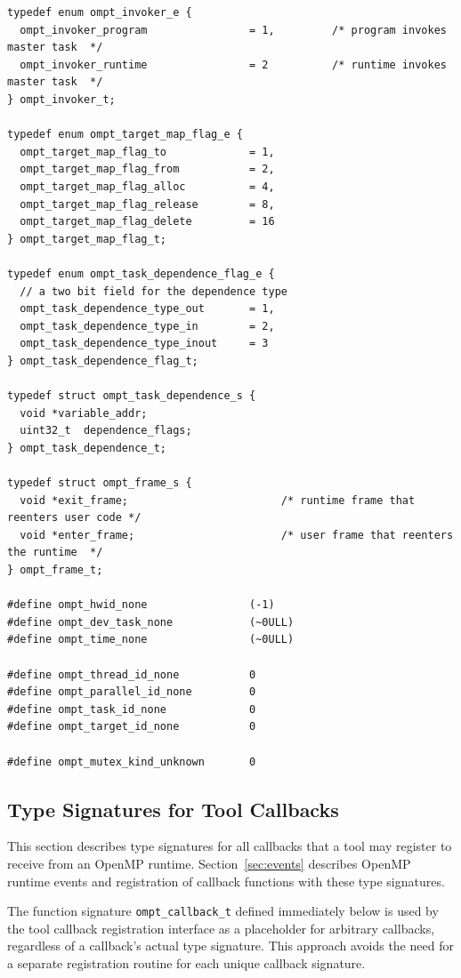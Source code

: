 \documentclass{article}
\begin{document}
{\begin{verbatim}
typedef enum ompt_invoker_e {
  ompt_invoker_program                = 1,         /* program invokes master task  */
  ompt_invoker_runtime                = 2          /* runtime invokes master task  */
} ompt_invoker_t;

typedef enum ompt_target_map_flag_e {
  ompt_target_map_flag_to             = 1,
  ompt_target_map_flag_from           = 2,
  ompt_target_map_flag_alloc          = 4,
  ompt_target_map_flag_release        = 8, 
  ompt_target_map_flag_delete         = 16
} ompt_target_map_flag_t;

typedef enum ompt_task_dependence_flag_e {
  // a two bit field for the dependence type
  ompt_task_dependence_type_out       = 1,
  ompt_task_dependence_type_in        = 2,
  ompt_task_dependence_type_inout     = 3
} ompt_task_dependence_flag_t;

typedef struct ompt_task_dependence_s {
  void *variable_addr;
  uint32_t  dependence_flags;
} ompt_task_dependence_t;

typedef struct ompt_frame_s {
  void *exit_frame;                        /* runtime frame that reenters user code */
  void *enter_frame;                       /* user frame that reenters the runtime  */
} ompt_frame_t;

#define ompt_hwid_none                (-1)
#define ompt_dev_task_none            (~0ULL)
#define ompt_time_none                (~0ULL)

#define ompt_thread_id_none           0
#define ompt_parallel_id_none         0
#define ompt_task_id_none             0
#define ompt_target_id_none           0

#define ompt_mutex_kind_unknown       0
\end{verbatim}
\clearpage

\subsection{Type Signatures for Tool Callbacks}
\label{appendix:ompt-types:callbacks}
This section describes type signatures for all  callbacks that a tool may register to receive from an OpenMP runtime. Section~\ref{sec:events} describes OpenMP runtime events and registration of
callback functions with these type signatures.

The function signature  \verb|ompt_callback_t| defined immediately below is used by the tool callback registration interface as a placeholder for arbitrary callbacks,
 regardless of a callback's actual type signature. This approach avoids the need for a separate registration routine for each unique callback signature. 

}
\end{document}
